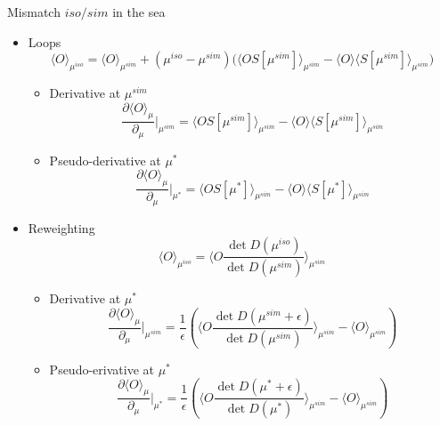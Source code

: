 \documentclass[xcolor={dvipsnames,table}]{beamer}
\begin{document}
\begin{frame}{Mismatch $iso/sim$ in the sea}
  \begin{itemize}\setlength\itemsep{1em}
    \item<1-> Loops
      $$\langle O \rangle_{\mu^{iso}}  =\langle O \rangle_{\mu^{sim}} + (\mu^{iso}-\mu^{sim})
        \bigg(\langle O  S[\mu^{sim}]\rangle_{\mu^{sim}} - \langle O \rangle \langle S[\mu^{sim}]\rangle_{\mu^{sim}} \bigg)$$
      \vspace{1em}
      \begin{itemize}\setlength\itemsep{1em}
        \item<1-> Derivative at $\mu^{sim}$
          $$
            \frac{\partial \langle O \rangle_{\mu} }
            { \partial_\mu } \bigg|_{\mu^{sim}}
            =\langle O  S[\mu^{sim}]\rangle_{\mu^{sim}} - \langle O \rangle \langle S[\mu^{sim}]\rangle_{\mu^{sim}}
          $$
        \item<2-> Pseudo-derivative at $\mu^{*}$
          $$
            \frac{\partial \langle O \rangle_{\mu} }
            { \partial_\mu } \bigg|_{\mu^{*}}
            =\langle O  S[\mu^{*}]\rangle_{\mu^{sim}} - \langle O \rangle \langle S[\mu^{*}]\rangle_{\mu^{sim}}
          $$
      \end{itemize}
    \item<3-> Reweighting
      $$
        \langle O \rangle_{\mu^{iso}}   = \langle O  \frac{\det{D(\mu^{iso})}}{\det{D(\mu^{sim})}}\rangle_{\mu^{sim}}
      $$
      \begin{itemize}\setlength\itemsep{1em}
        \item<3-> Derivative at $\mu^*$
          $$
            \frac{\partial \langle O \rangle_{\mu} }
            { \partial_\mu } \bigg|_{\mu^{sim}}
            =\frac{1}{\epsilon}\left(\langle O  \frac{\det{D(\mu^{sim}+\epsilon)}}{\det{D(\mu^{sim})}}\rangle_{\mu^{sim}}  - \langle O \rangle_{\mu^{sim}}\right)
          $$
        \item<4-> Pseudo-erivative at $\mu^*$
          $$
            \frac{\partial \langle O \rangle_{\mu} }
            { \partial_\mu } \bigg|_{\mu^{*}}
            =\frac{1}{\epsilon}\left(\langle O  \frac{\det{D(\mu^{*}+\epsilon)}}{\det{D(\mu^{*})}}\rangle_{\mu^{sim}}  - \langle O \rangle_{\mu^{sim}}\right)
          $$
      \end{itemize}
  \end{itemize}
\end{frame}
\end{document}
